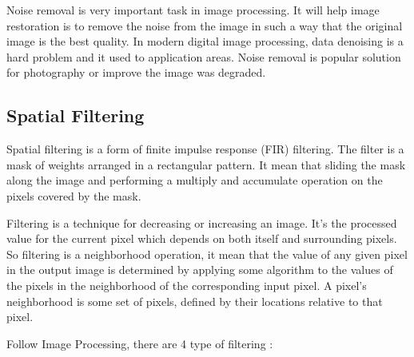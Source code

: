 \documentclass[10pt]{article}
\begin{document}
Noise removal is very important task in image processing. It will help image restoration is to remove the noise from the image in such a way that the original image is the best quality. In modern digital image processing, data denoising is a hard problem and it used to application areas. Noise removal is popular solution for photography or improve the  image was degraded.


\subsection{Spatial Filtering}
Spatial filtering is a form of finite impulse response (FIR) filtering. The filter is a mask of weights arranged in a rectangular pattern. It mean that sliding the mask along the image and performing a multiply and accumulate operation on the pixels covered by the mask.


Filtering is a technique for decreasing or increasing an image. It's the processed value for the current pixel which depends on both itself and surrounding pixels.
So filtering is a neighborhood operation, it mean that the value of any given pixel in the output image is determined by applying some algorithm to the values of the pixels in the neighborhood of the corresponding input pixel. A pixel's neighborhood is some set of pixels, defined by their locations relative to that pixel. 

Follow Image Processing,  there are 4 type of filtering :
\end{document}
